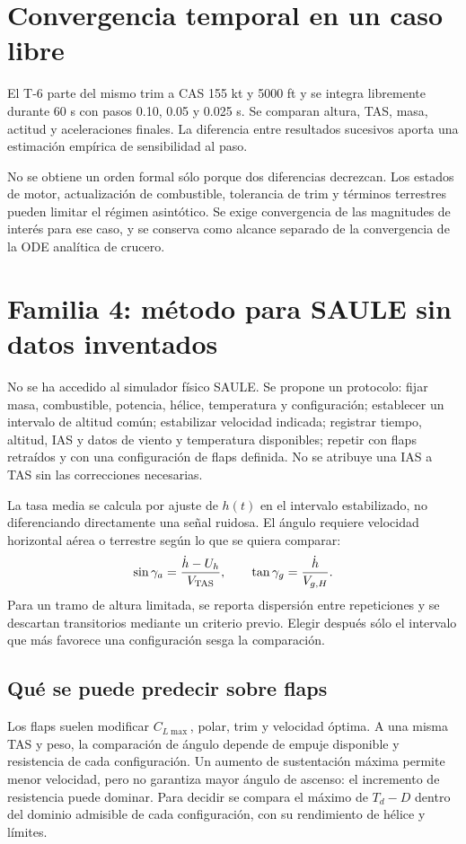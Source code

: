 \section{Convergencia temporal en un caso libre}
El T-6 parte del mismo trim a CAS 155 kt y 5000 ft y se integra libremente durante 60 s con pasos 0.10, 0.05 y 0.025 s. Se comparan altura, TAS, masa, actitud y aceleraciones finales. La diferencia entre resultados sucesivos aporta una estimación empírica de sensibilidad al paso.

No se obtiene un orden formal sólo porque dos diferencias decrezcan. Los estados de motor, actualización de combustible, tolerancia de trim y términos terrestres pueden limitar el régimen asintótico. Se exige convergencia de las magnitudes de interés para ese caso, y se conserva como alcance separado de la convergencia de la ODE analítica de crucero.

\section{Familia 4: método para SAULE sin datos inventados}
No se ha accedido al simulador físico SAULE. Se propone un protocolo: fijar masa, combustible, potencia, hélice, temperatura y configuración; establecer un intervalo de altitud común; estabilizar velocidad indicada; registrar tiempo, altitud, IAS y datos de viento y temperatura disponibles; repetir con flaps retraídos y con una configuración de flaps definida. No se atribuye una IAS a TAS sin las correcciones necesarias.

La tasa media se calcula por ajuste de $h(t)$ en el intervalo estabilizado, no diferenciando directamente una señal ruidosa. El ángulo requiere velocidad horizontal aérea o terrestre según lo que se quiera comparar:
\begin{equation}
\sin\gamma_a=\frac{\dot h-U_h}{V_{\rm TAS}},\qquad
\tan\gamma_g=\frac{\dot h}{V_{g,H}}.
\end{equation}
Para un tramo de altura limitada, se reporta dispersión entre repeticiones y se descartan transitorios mediante un criterio previo. Elegir después sólo el intervalo que más favorece una configuración sesga la comparación.

\subsection{Qué se puede predecir sobre flaps}
Los flaps suelen modificar $C_{L\max}$, polar, trim y velocidad óptima. A una misma TAS y peso, la comparación de ángulo depende de empuje disponible y resistencia de cada configuración. Un aumento de sustentación máxima permite menor velocidad, pero no garantiza mayor ángulo de ascenso: el incremento de resistencia puede dominar. Para decidir se compara el máximo de $T_d-D$ dentro del dominio admisible de cada configuración, con su rendimiento de hélice y límites.

